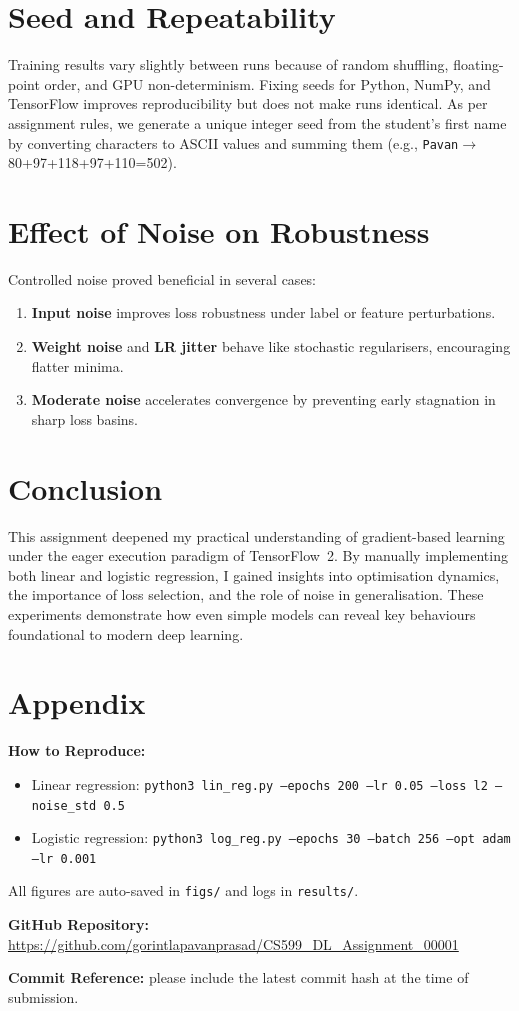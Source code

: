 \documentclass{article}
\begin{document}
\section{Seed and Repeatability}
Training results vary slightly between runs because of random shuffling, floating-point order, and GPU non-determinism. Fixing seeds for Python, NumPy, and TensorFlow improves reproducibility but does not make runs identical. As per assignment rules, we generate a unique integer seed from the student’s first name by converting characters to ASCII values and summing them (e.g., \texttt{Pavan}$\to$80+97+118+97+110=502).

\section{Effect of Noise on Robustness}
Controlled noise proved beneficial in several cases:
\begin{enumerate}
    \item \textbf{Input noise} improves loss robustness under label or feature perturbations.
    \item \textbf{Weight noise} and \textbf{LR jitter} behave like stochastic regularisers, encouraging flatter minima.
    \item \textbf{Moderate noise} accelerates convergence by preventing early stagnation in sharp loss basins.
\end{enumerate}

\section{Conclusion}
This assignment deepened my practical understanding of gradient-based learning under the eager execution paradigm of TensorFlow~2. By manually implementing both linear and logistic regression, I gained insights into optimisation dynamics, the importance of loss selection, and the role of noise in generalisation. These experiments demonstrate how even simple models can reveal key behaviours foundational to modern deep learning.

\section*{Appendix}
\textbf{How to Reproduce:}
\begin{itemize}
    \item Linear regression: \texttt{python3 lin\_reg.py --epochs 200 --lr 0.05 --loss l2 --noise\_std 0.5}
    \item Logistic regression: \texttt{python3 log\_reg.py --epochs 30 --batch 256 --opt adam --lr 0.001}
\end{itemize}
All figures are auto-saved in \texttt{figs/} and logs in \texttt{results/}.  

\textbf{GitHub Repository:} \\
\url{https://github.com/gorintlapavanprasad/CS599_DL_Assignment_00001}

\textbf{Commit Reference:} please include the latest commit hash at the time of submission.
\end{document}
